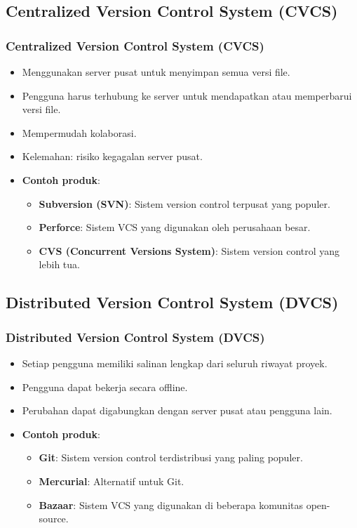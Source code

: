 \documentclass[aspectratio=169, table]{beamer}
\begin{document}
\subsection{Centralized Version Control System (CVCS)}

\begin{frame}[fragile]
\frametitle{Centralized Version Control System (CVCS)}
\begin{itemize}
\item Menggunakan server pusat untuk menyimpan semua versi file.
\item Pengguna harus terhubung ke server untuk mendapatkan atau memperbarui versi file.
\item Mempermudah kolaborasi.
\item Kelemahan: risiko kegagalan server pusat.
\item \textbf{Contoh produk}:
\begin{itemize}
	\item \textbf{Subversion (SVN)}: Sistem version control terpusat yang populer.
	\item \textbf{Perforce}: Sistem VCS yang digunakan oleh perusahaan besar.
	\item \textbf{CVS (Concurrent Versions System)}: Sistem version control yang lebih tua.
\end{itemize}
\end{itemize}
\end{frame}

\subsection{Distributed Version Control System (DVCS)}

\begin{frame}[fragile]
\frametitle{Distributed Version Control System (DVCS)}
\begin{itemize}
\item Setiap pengguna memiliki salinan lengkap dari seluruh riwayat proyek.
\item Pengguna dapat bekerja secara offline.
\item Perubahan dapat digabungkan dengan server pusat atau pengguna lain.
\item \textbf{Contoh produk}:
\begin{itemize}
	\item \textbf{Git}: Sistem version control terdistribusi yang paling populer.
	\item \textbf{Mercurial}: Alternatif untuk Git.
	\item \textbf{Bazaar}: Sistem VCS yang digunakan di beberapa komunitas open-source.
\end{itemize}
\end{itemize}
\end{frame}
\end{document}
